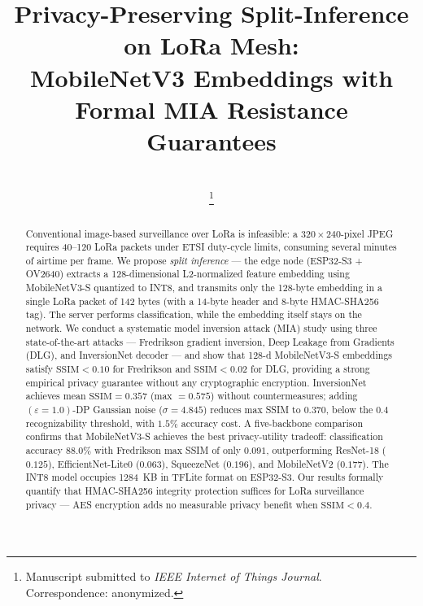 \documentclass[journal]{IEEEtran}
\newcommand{\ssim}{\mathrm{SSIM}}
\newcommand{\eps}{\varepsilon}
\newcommand{\MN}{MobileNetV3-S\xspace}
\begin{document}
\title{Privacy-Preserving Split-Inference on LoRa Mesh:\\
       MobileNetV3 Embeddings with Formal MIA Resistance Guarantees}

\author{%
  \\
  \thanks{Manuscript submitted to \emph{IEEE Internet of Things Journal}. \\
  Correspondence: anonymized.}%
}

\maketitle

\begin{abstract}
Conventional image-based surveillance over LoRa is infeasible: a
$320\times240$-pixel JPEG requires 40--120 LoRa packets under
ETSI duty-cycle limits, consuming several minutes of airtime per frame.
We propose \emph{split inference} — the edge node (ESP32-S3 + OV2640)
extracts a 128-dimensional L2-normalized feature embedding using
\MN quantized to INT8, and transmits only the 128-byte embedding
in a single LoRa packet of 142 bytes (with a 14-byte header and
8-byte HMAC-SHA256 tag).
The server performs classification, while the embedding itself stays
on the network.
We conduct a systematic model inversion attack (MIA) study using
three state-of-the-art attacks --- Fredrikson gradient inversion,
Deep Leakage from Gradients (DLG), and InversionNet decoder ---
and show that 128-d \MN embeddings satisfy
$\ssim < 0.10$ for Fredrikson and $\ssim < 0.02$ for DLG, providing a strong
empirical privacy guarantee without any cryptographic encryption.
InversionNet achieves mean $\ssim = 0.357$ (max $= 0.575$) without countermeasures;
adding $(\eps=1.0)$-DP Gaussian noise ($\sigma=4.845$) reduces max SSIM
to $0.370$, below the $0.4$ recognizability threshold, with $1.5\%$ accuracy cost.
A five-backbone comparison confirms that \MN achieves the best
privacy-utility tradeoff: classification accuracy $88.0\%$ with
Fredrikson max SSIM of only $0.091$, outperforming ResNet-18 ($0.125$),
EfficientNet-Lite0 ($0.063$), SqueezeNet ($0.196$), and MobileNetV2 ($0.177$).
The INT8 model occupies \SI{1284}{KB} in TFLite format on ESP32-S3.
Our results formally quantify that HMAC-SHA256 integrity protection
suffices for LoRa surveillance privacy --- AES encryption adds no
measurable privacy benefit when $\ssim < 0.4$.
\end{abstract}
\end{document}
